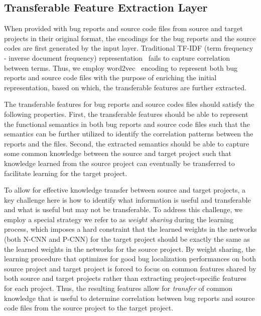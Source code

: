 \subsection{Transferable Feature Extraction Layer}

When provided with bug reports and source code files from source and target projects in their original format, the encodings for the bug reports and the source codes are first generated by the input layer. Traditional TF-IDF (term frequency - inverse document frequency) representation~\cite{christopher2008introduction} fails to capture correlation between terms. Thus, we employ word2vec~\cite{abs-1301-3781} encoding to represent both bug reports and source code files with the purpose of enriching the initial representation, based on which, the transferable features are further extracted.

The transferable features for bug reports and source codes files should satisfy the following properties. First, the transferable features should be able to represent the functional semantics in both bug reports and source code files such that the semantics can be further utilized to identify the correlation patterns between the reports and the files. Second, the extracted semantics should be able to capture some common knowledge between the source and target project such that knowledge learned from the source project can eventually be transferred to facilitate learning for the target project.

To allow for effective knowledge transfer between source and target projects, a key challenge here is how to identify what information is useful and transferable and what is useful but may not be transferable. To address this challenge, we employ a special strategy we refer to as \emph{weight sharing} during the learning process, which imposes a hard constraint that the learned weights in the networks (both N-CNN and P-CNN) for the target project should be exactly the same as the learned weights in the networks for the source project. By weight sharing, the learning procedure that optimizes for good bug localization performances on both source project and target project is forced to focus on common features shared by both source and target projects rather than extracting project-specific features for each project. Thus, the resulting features allow for \emph{transfer} of common knowledge that is useful to determine correlation between bug reports and source code files from the source project to the target project.
 

